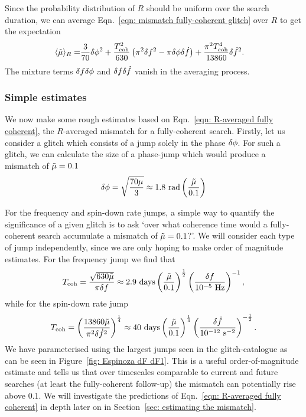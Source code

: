 \documentclass[../full_thesis/full_thesis.tex]{subfiles}
\begin{document}
Since the probability distribution of
$R$ should be uniform over the search duration, we can average Eqn.~\eqref{eqn:
mismatch fully-coherent glitch} over $R$ to get the expectation
\begin{align}
\langle \tilde{\mu} \rangle_{R} = &
\frac{3}{70}\delta\phi^{2}
+ \frac{T_{\mathrm{coh}}^{2}}{630}\left(\pi^{2}\delta f^{2}
- \pi\delta\phi\delta\dot{f}\right)
+ \frac{\pi^{2}T_{\mathrm{coh}}^{4}}{13860} \delta\dot{f}^{2}.
\label{eqn: R-averaged fully coherent}
\end{align}
The mixture terms $\delta f\delta\phi$ and
$\delta f\delta\dot{f}$ vanish in the averaging process.

\subsubsection{Simple estimates}

We now make some rough estimates based on Eqn.~\eqref{eqn: R-averaged
fully coherent}, the $R$-averaged mismatch for a fully-coherent search.
Firstly, let us consider a glitch which consists of a jump solely in the phase
$\delta\phi$. For such a glitch, we can calculate the size of a phase-jump
which would produce a mismatch of $\tilde{\mu}=0.1$
\begin{align}
\delta\phi =
\sqrt{\frac{70\mu}{3}} \approx 1.8 \textrm{ rad} \left(\frac{\tilde{\mu}}{0.1}\right)
\end{align}

For the frequency and spin-down rate jumps,
a simple way to quantify the significance of a given glitch is to ask `over
what coherence time would a fully-coherent search accumulate a mismatch of
$\tilde{\mu}=0.1$?'. We will consider each type of jump independently, since we are
only hoping to make order of magnitude estimates.
For the frequency jump we find that
\begin{align}
T_\textrm{coh} = \frac{\sqrt{630 \tilde{\mu}}}{\pi\delta f}
\approx 2.9 \textrm{ days} \left(\frac{\tilde{\mu}}{0.1}\right)^{\frac{1}{2}}
\left(\frac{\delta f}{10^{-5} \textrm{ Hz}}\right)^{-1},
\end{align}
while for the spin-down rate jump
\begin{align}
T_\textrm{coh} =
\left(\frac{13860 \tilde{\mu}}{\pi^{2}\delta\dot{f}^{2}}\right)^{\frac{1}{4}}
\approx 40 \textrm{ days} \left(\frac{\tilde{\mu}}{0.1}\right)^{\frac{1}{4}}
\left(\frac{\delta\dot{f}}{10^{-12} \textrm{ s}^{-2}}\right)^{-\frac{1}{2}}.
\end{align}
We have parameterised using the largest jumps seen in the glitch-catalogue as
can be seen in Figure~\ref{fig: Espinoza dF dF1}. This is a useful
order-of-magnitude estimate and tells us that over timescales comparable to
current and future searches (at least the fully-coherent follow-up) the
mismatch can potentially rise above 0.1.  We will investigate the predictions
of Eqn.~\eqref{eqn: R-averaged fully coherent} in depth later on in
Section~\ref{sec: estimating the mismatch}.
\end{document}
